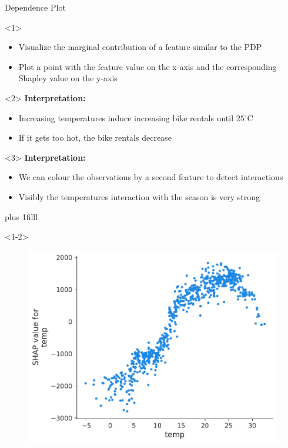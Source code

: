 \documentclass[11pt,compress,t,notes=noshow, aspectratio=169, xcolor=table]{beamer}
\newcommand{\btVFill}{\vskip0pt plus 1filll}
\begin{document}
\begin{frame}{Dependence Plot}

\begin{onlyenv}<1>
\begin{itemize}
    \item Visualize the marginal contribution of a feature similar to the PDP 
    \item Plot a point with the feature value on the x-axis and the corresponding Shapley value on the y-axis
\end{itemize}

\end{onlyenv}

\begin{onlyenv}<2>
\textbf{Interpretation:}\\
\begin{itemize}
    \item Increasing temperatures induce increasing bike rentals until $25^\circ\text{C}$
    \item If it gets too hot, the bike rentals decrease
\end{itemize}
\end{onlyenv}

\begin{onlyenv}<3>
\textbf{Interpretation:}\\
\begin{itemize}
    \item We can colour the observations by a second feature to detect interactions
    \item Visibly the temperatures interaction with the season is very strong
\end{itemize}
\end{onlyenv}


\btVFill
\begin{onlyenv}<1-2>
\begin{figure}
    \centering
    \includegraphics[width=0.5\columnwidth]{figure_man/global_shap_depend.pdf}
\end{figure}
\end{onlyenv}


\end{frame}
\end{document}
